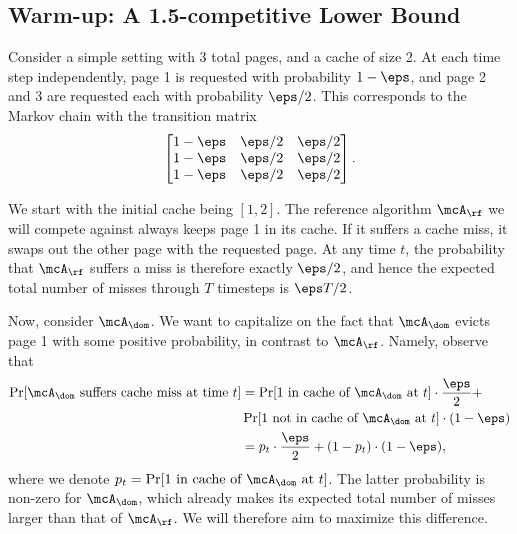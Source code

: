 \documentclass[11pt]{article}
\begin{document}
\subsection{Warm-up: A 1.5-competitive Lower Bound}
\label{sec:1.5-lb}

Consider a simple setting with 3 total pages, and a cache of size 2. At each time step independently, page 1 is requested with probability $1-\eps$, and page 2 and 3 are requested each with probability $\eps/2$. This corresponds to the Markov chain with the transition matrix
\begin{align*}
    \begin{bmatrix}
        1-\eps & \eps/2 & \eps/2 \\
        1-\eps & \eps/2 & \eps/2 \\
        1-\eps & \eps/2 & \eps/2
    \end{bmatrix}.
\end{align*}

We start with the initial cache being $[1,2]$. The reference algorithm $\mcA_{\rf}$ we will compete against always keeps page 1 in its cache. If it suffers a cache miss, it swaps out the other page with the requested page. At any time $t$, the probability that $\mcA_{\rf}$ suffers a miss is therefore exactly $\eps/2$, and hence the expected total number of misses through $T$ timesteps is $\eps T/2$.

Now, consider $\mcA_{\dom}$. We want to capitalize on the fact that $\mcA_\dom$ evicts page 1 with some positive probability, in contrast to $\mcA_\rf$. Namely, observe that 
\begin{align}
    \Pr[\text{$\mcA_\dom$ suffers cache miss at time $t$}] &= \Pr[\text{$1$ in cache of $\mcA_\dom$ at $t$}] \cdot \frac{\eps}{2} + \nonumber\\
    & \Pr[\text{$1$ not in cache of $\mcA_\dom$ at $t$}] \cdot (1-\eps) \nonumber \\
    &= p_t \cdot \frac{\eps}{2} + (1-p_t) \cdot (1-\eps), \label{eqn:misses-A-dom}
\end{align}
where we denote $p_t = \Pr[\text{$1$ in cache of $\mcA_\dom$ at $t$}]$. The latter probability is non-zero for $\mcA_\dom$, which already makes its expected total number of misses larger than that of $\mcA_\rf$. We will therefore aim to maximize this difference.
\end{document}
